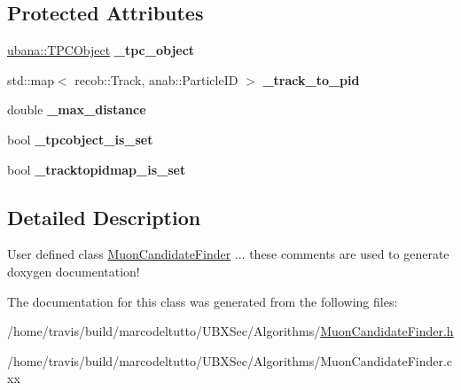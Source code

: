 \subsection*{\-Protected \-Attributes}
\begin{DoxyCompactItemize}
\item 
\hypertarget{classubxsec_1_1MuonCandidateFinder_ad9cc15de89d9470bda9d22d1aca4c015}{\hyperlink{classubana_1_1TPCObject}{ubana\-::\-T\-P\-C\-Object} {\bfseries \-\_\-tpc\-\_\-object}}\label{classubxsec_1_1MuonCandidateFinder_ad9cc15de89d9470bda9d22d1aca4c015}

\item 
\hypertarget{classubxsec_1_1MuonCandidateFinder_a83b91e5698c4485fc82020b7aeb15b83}{std\-::map$<$ recob\-::\-Track, \*
anab\-::\-Particle\-I\-D $>$ {\bfseries \-\_\-track\-\_\-to\-\_\-pid}}\label{classubxsec_1_1MuonCandidateFinder_a83b91e5698c4485fc82020b7aeb15b83}

\item 
\hypertarget{classubxsec_1_1MuonCandidateFinder_a4f3bdddbb7e6f506410b493d8537285f}{double {\bfseries \-\_\-max\-\_\-distance}}\label{classubxsec_1_1MuonCandidateFinder_a4f3bdddbb7e6f506410b493d8537285f}

\item 
\hypertarget{classubxsec_1_1MuonCandidateFinder_acb67a07e9887ac0963c7fc16290438e0}{bool {\bfseries \-\_\-tpcobject\-\_\-is\-\_\-set}}\label{classubxsec_1_1MuonCandidateFinder_acb67a07e9887ac0963c7fc16290438e0}

\item 
\hypertarget{classubxsec_1_1MuonCandidateFinder_a1701c31f05e4f6fcae51417f6cd5d086}{bool {\bfseries \-\_\-tracktopidmap\-\_\-is\-\_\-set}}\label{classubxsec_1_1MuonCandidateFinder_a1701c31f05e4f6fcae51417f6cd5d086}

\end{DoxyCompactItemize}


\subsection{\-Detailed \-Description}
\-User defined class \hyperlink{classubxsec_1_1MuonCandidateFinder}{\-Muon\-Candidate\-Finder} ... these comments are used to generate doxygen documentation! 

\-The documentation for this class was generated from the following files\-:\begin{DoxyCompactItemize}
\item 
/home/travis/build/marcodeltutto/\-U\-B\-X\-Sec/\-Algorithms/\hyperlink{MuonCandidateFinder_8h}{\-Muon\-Candidate\-Finder.\-h}\item 
/home/travis/build/marcodeltutto/\-U\-B\-X\-Sec/\-Algorithms/\-Muon\-Candidate\-Finder.\-cxx\end{DoxyCompactItemize}
